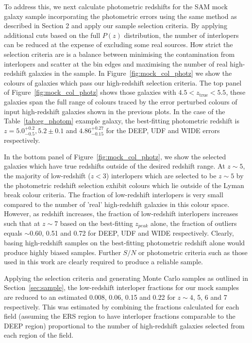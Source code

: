 To address this, we next calculate photometric redshifts for the SAM mock galaxy sample incorporating the photometric errors using the same method as described in Section 2 and apply our sample selection criteria. By applying additional cuts based on the full $P(z)$ distribution, the number of interlopers can be reduced at the expense of excluding some real sources.  How strict the selection criteria are is a balance between minimising the contamination from interlopers and scatter at the bin edges and maximising the number of real high-redshift galaxies in the sample. In Figure~\ref{fig:mock_col_photz} we show the colours of galaxies which pass our high-redshift selection criteria. The top panel of Figure~\ref{fig:mock_col_photz} shows those galaxies with $4.5 < z_{\text{true}} < 5.5$, these galaxies span the full range of colours traced by the error perturbed colours of input high-redshift galaxies shown in the previous plots. In the case of the Table~\ref{tab:eg_photom} example galaxy, the best-fitting photometric redshift is $z = 5.0^{+0.2}_{-0.5}, 5.2\pm0.1$ and $4.86^{+0.27}_{-0.15}$ for the DEEP, UDF and WIDE errors respectively. 

In the bottom panel of Figure~\ref{fig:mock_col_photz}, we show the selected galaxies which have true redshifts outside of the desired redshift range. At $z\sim 5$, the majority of low-redshift ($z < 3$) interlopers which are selected to be $z\sim5$ by the photometric redshift selection exhibit colours which lie outside of the Lyman break colour criteria. The fraction of low-redshift interlopers is very small compared to the number of 'real' high-redshift galaxies in this colour space. However, as redshift increases, the fraction of low-redshift interlopers increases such that at $z \sim 7$ based on the best-fitting $z_{peak}$ alone, the fraction of outliers equals $\sim 0.60$, 0.51 and 0.72 for DEEP, UDF and WIDE respectively. Clearly, basing high-redshift samples on the best-fitting photometric redshift alone would produce highly biased samples. Further $S/N$ or photometric criteria such as those used in this work are clearly required to produce a reliable sample.

Applying the selection criteria and generating Monte Carlo samples as outlined in Section~\ref{sec:sample}, the low-redshift interloper fractions for our mock samples are reduced to an estimated 0.008, 0.06, 0.15 and 0.22 for $z \sim 4$, 5, 6 and 7 respectively. This was estimated by combining the fractions calculated for each field (assuming the ERS region to have interloper fractions comparable to the DEEP region) proportional to the number of high-redshift galaxies selected from each region of the field. 

